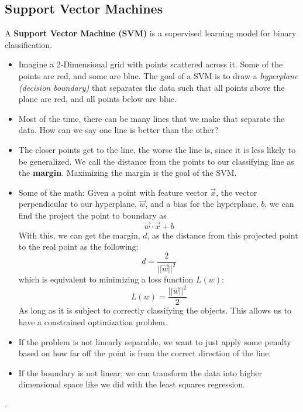 \documentclass{article}
\begin{document}
\subsection{Support Vector Machines}
A \textbf{Support Vector Machine (SVM)} is a supervised learning model for binary classification. 
\begin{itemize}
    \item Imagine a 2-Dimensional grid with points scattered across it. Some of the points are red, and some are blue. The goal of a SVM is to draw a \textit{hyperplane (decision boundary)} that separates the data such that all points above the plane are red, and all points below are blue. 
    \item Most of the time, there can be many lines that we make that separate the data. How can we say one line is better than the other? 
    \item The closer points get to the line, the worse the line is, since it is less likely to be generalized. We call the distance from the points to our classifying line as the \textbf{margin}. Maximizing the margin is the goal of the SVM.
    \item Some of the math: Given a point with feature vector $\vec{x}$, the vector perpendicular to our hyperplane, $\vec{w}$, and a bias for the hyperplane, $b$, we can find the project the point to boundary as
    $$\vec{w} \cdot \vec{x} + b$$
    With this, we can get the margin, $d$, as the distance from this projected point to the real point as the following:
    $$d = \frac{2}{||\vec{w}||^2}$$
    which is equivalent to minimizing a loss function $L(w)$:
    $$L(w) = \frac{||\vec{w}||^2}{2}$$
    As long as it is subject to correctly classifying the objects. This allows us to have a constrained optimization problem. 
    \item If the problem is not linearly separable, we want to just apply some penalty based on how far off the point is from the correct direction of the line.
    \item If the boundary is not linear, we can transform the data into higher dimensional space like we did with the least squares regression.
\end{itemize}.  
\end{document}
